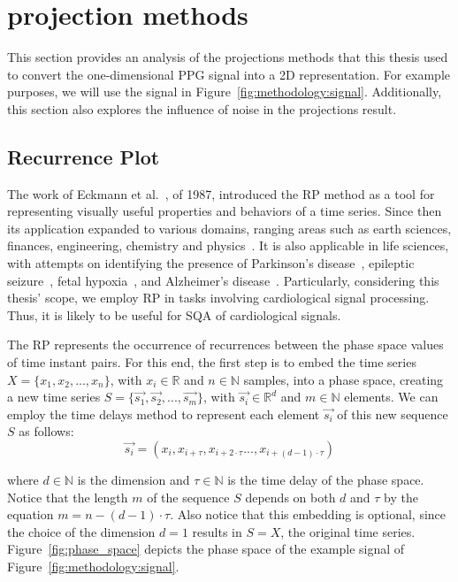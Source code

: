 \section{ projection methods}

This section provides an analysis of the  projections methods that this thesis used to convert the one-dimensional \gls{PPG} signal into a 2D representation. For example purposes, we will use the signal in Figure~\ref{fig:methodology:signal}. Additionally, this section also explores the influence of noise in the projections result. 



\subsection{Recurrence Plot}

The work of Eckmann et al.~\cite{rp-1}, of 1987, introduced the \gls{RP} method as a tool for representing visually useful properties and behaviors of a time series. Since then its application expanded to various domains, ranging areas such as earth sciences, finances, engineering, chemistry and physics~\cite{rp-2}. It is also applicable in life sciences, with attempts on identifying the presence of Parkinson's disease~\cite{rp-3}, epileptic seizure~\cite{rp-4}, fetal hypoxia~\cite{rp-5}, and Alzheimer's disease~\cite{rp-6}. Particularly, considering this thesis' scope, we employ \gls{RP} in tasks involving cardiological signal processing. Thus, it is likely to be useful for \gls{SQA} of cardiological signals.  

The \gls{RP} represents the occurrence of recurrences between the phase space values of time instant pairs. For this end, the first step is to embed the time series $X=\{x_1,x_2,...,x_n\}$, with $ x_i \in \mathbb{R}$ and $n \in \mathbb{N}$ samples, into a phase space, creating a new time series $S=\{\vec{s_1},\vec{s_2},...,\vec{s_m}\}$, with $ \vec{s_i} \in \mathbb{R}^d$ and $m \in \mathbb{N}$ elements. We can employ the time delays method to represent each element $\vec{s_i}$ of this new sequence $S$ as follows:
\begin{equation}
    \vec{s_i} = (x_i, x_{i + \tau}, x_{i + 2\cdot \tau} ..., x_{i + (d-1) \cdot \tau})
\end{equation}   

\noindent where $d \in \mathbb{N}$ is the dimension and $\tau \in \mathbb{N}$ is the time delay of the phase space. Notice that the length $m$ of the sequence $S$ depends on both $d$ and $\tau$ by the equation $m = n - (d-1) \cdot \tau$. Also notice that this embedding is optional, since the choice of the dimension $d=1$ results in $S=X$, the original time series. Figure~\ref{fig:phase_space} depicts the phase space of the example signal of Figure~\ref{fig:methodology:signal}.

